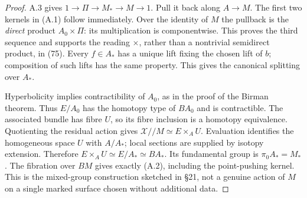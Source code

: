 \begin{proof}
A.3 gives $1\to\Pi\to M_*\to M\to1$. Pull it back along $A\to M$. The first two kernels in (A.1) follow immediately. Over the identity of $M$ the pullback is the \emph{direct} product $A_0\times\Pi$: its multiplication is componentwise. This proves the third sequence and supports the reading $\times$, rather than a nontrivial semidirect product, in (75). Every $f\in A_*$ has a unique lift fixing the chosen lift of $b$; composition of such lifts has the same property. This gives the canonical splitting over $A_*$.

Hyperbolicity implies contractibility of $A_0$, as in the proof of the Birman theorem. Thus $E/A_0$ has the homotopy type of $BA_0$ and is contractible. The associated bundle has fibre $U$, so its fibre inclusion is a homotopy equivalence. Quotienting the residual action gives
$\mathcal X/\!/M\simeq E\times_AU$. Evaluation identifies the homogeneous space $U$ with $A/A_*$; local sections are supplied by isotopy extension. Therefore $E\times_AU\simeq E/A_*\simeq BA_*$. Its fundamental group is $\pi_0A_*=M_*$. The fibration over $BM$ gives exactly (A.2), including the point-pushing kernel. This is the mixed-group construction sketched in \S21, not a genuine action of $M$ on a single marked surface chosen without additional data.
\end{proof}

